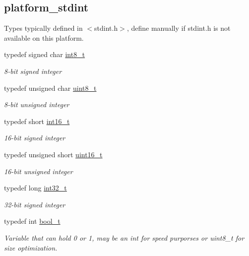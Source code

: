 \subsection*{platform\-\_\-stdint}
\label{_amgrpd25616584cb4ee40080d217a7b385214}%
Types typically defined in $<$stdint.\-h$>$, define manually if stdint.\-h is not available on this platform. \begin{DoxyCompactItemize}
\item 
typedef signed char \hyperlink{group__hal_ga20c38cc5aac7cc6b0a3c6ab05428436d}{int8\-\_\-t}
\begin{DoxyCompactList}\small\item\em 8-\/bit signed integer \end{DoxyCompactList}\item 
typedef unsigned char \hyperlink{group__hal_gae1affc9ca37cfb624959c866a73f83c2}{uint8\-\_\-t}
\begin{DoxyCompactList}\small\item\em 8-\/bit unsigned integer \end{DoxyCompactList}\item 
typedef short \hyperlink{group__hal_ga2140805d08462d474b82ddc8d1c2f3e6}{int16\-\_\-t}
\begin{DoxyCompactList}\small\item\em 16-\/bit signed integer \end{DoxyCompactList}\item 
typedef unsigned short \hyperlink{group__hal_ga5a8b2dc9e45a9ee81a94ef304fb62505}{uint16\-\_\-t}
\begin{DoxyCompactList}\small\item\em 16-\/bit unsigned integer \end{DoxyCompactList}\item 
typedef long \hyperlink{group__hal_gafd12020da5a235dfcf0c3c748fb5baed}{int32\-\_\-t}
\begin{DoxyCompactList}\small\item\em 32-\/bit signed integer \end{DoxyCompactList}\item 
\hypertarget{group__hal_ga04dd5074964518403bf944f2b240a5f8}{typedef int \hyperlink{group__hal_ga04dd5074964518403bf944f2b240a5f8}{bool\-\_\-t}}\label{group__hal_ga04dd5074964518403bf944f2b240a5f8}

\begin{DoxyCompactList}\small\item\em Variable that can hold 0 or 1, may be an {\ttfamily int} for speed purporses or {\ttfamily uint8\-\_\-t} for size optimization. \end{DoxyCompactList}\end{DoxyCompactItemize}
